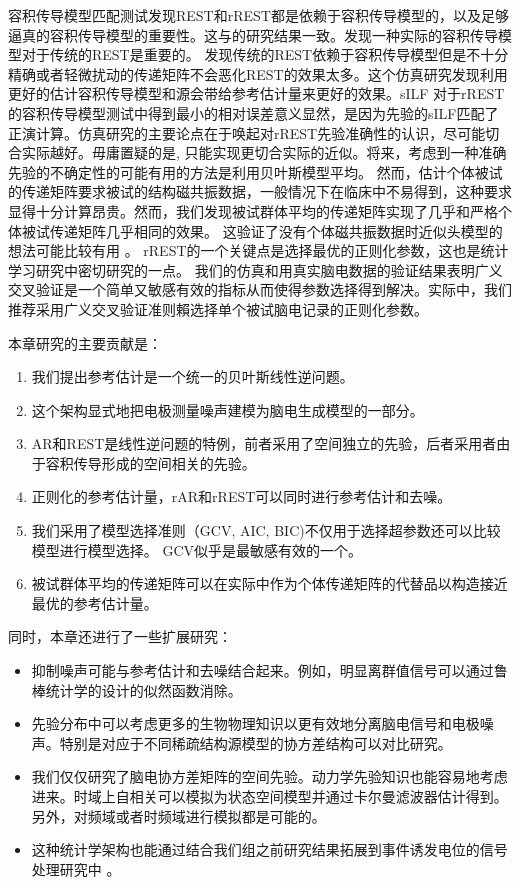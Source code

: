 容积传导模型匹配测试发现REST和rREST都是依赖于容积传导模型的，以及足够逼真的容积传导模型的重要性。这与的研究结果一致。\cite{liu_q_estimating_2015}发现一种实际的容积传导模型对于传统的REST是重要的。 \cite{hu_how_2018}发现传统的REST依赖于容积传导模型但是不十分精确或者轻微扰动的传递矩阵不会恶化REST的效果太多。这个仿真研究发现利用更好的估计容积传导模型和源会带给参考估计量来更好的效果。sILF 对于rREST的容积传导模型测试中得到最小的相对误差意义显然，是因为先验的sILF匹配了正演计算。仿真研究的主要论点在于唤起对rREST先验准确性的认识，尽可能切合实际越好。毋庸置疑的是, 只能实现更切合实际的近似。将来，考虑到一种准确先验的不确定性的可能有用的方法是利用贝叶斯模型平均。 然而，估计个体被试的传递矩阵要求被试的结构磁共振数据，一般情况下在临床中不易得到，这种要求显得十分计算昂贵。然而，我们发现被试群体平均的传递矩阵实现了几乎和严格个体被试传递矩阵几乎相同的效果。 这验证了没有个体磁共振数据时近似头模型的想法可能比较有用 。 rREST的一个关键点是选择最优的正则化参数，这也是统计学习研究中密切研究的一点。 我们的仿真和用真实脑电数据的验证结果表明广义交叉验证是一个简单又敏感有效的指标从而使得参数选择得到解决。实际中，我们推荐采用广义交叉验证准则賴选择单个被试脑电记录的正则化参数。

本章研究的主要贡献是：
\begin{enumerate}
	\item 我们提出参考估计是一个统一的贝叶斯线性逆问题。
	\item 这个架构显式地把电极测量噪声建模为脑电生成模型的一部分。
	\item AR和REST是线性逆问题的特例，前者采用了空间独立的先验，后者采用者由于容积传导形成的空间相关的先验。
	\item 正则化的参考估计量，rAR和rREST可以同时进行参考估计和去噪。
	\item 我们采用了模型选择准则（GCV, AIC, BIC)不仅用于选择超参数还可以比较模型进行模型选择。 GCV似乎是最敏感有效的一个。
	\item 被试群体平均的传递矩阵可以在实际中作为个体传递矩阵的代替品以构造接近最优的参考估计量。
\end{enumerate}

同时，本章还进行了一些扩展研究：
\begin{itemize}
	\item 抑制噪声可能与参考估计和去噪结合起来。例如，明显离群值信号可以通过鲁棒统计学的设计的似然函数消除。
	\item 先验分布中可以考虑更多的生物物理知识以更有效地分离脑电信号和电极噪声。特别是对应于不同稀疏结构源模型的协方差结构可以对比研究。
	\item 我们仅仅研究了脑电协方差矩阵的空间先验。动力学先验知识也能容易地考虑进来。时域上自相关可以模拟为状态空间模型并通过卡尔曼滤波器估计得到。 另外，对频域或者时频域进行模拟都是可能的。
	\item 这种统计学架构也能通过结合我们组之前研究结果拓展到事件诱发电位的信号处理研究中 。
\end{itemize}

